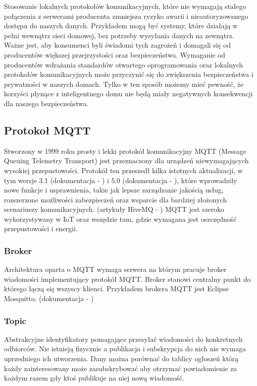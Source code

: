 Stosowanie lokalnych protokołów komunikacyjnych, które nie wymagają stałego połączenia z serwerami producenta zmniejsza ryzyko awarii i nieautoryzowanego dostępu do naszych danych. Przykładem mogą być systemy, które działają w pełni wewnątrz sieci domowej, bez potrzeby wysyłania danych na zewnątrz.\\

Ważne jest, aby konsumenci byli świadomi tych zagrożeń i domagali się od producentów większej przejrzystości oraz bezpieczeństwa. Wymaganie od producentów wdrażania standardów otwartego oprogramowania oraz lokalnych protokołów komunikacyjnych może przyczynić się do zwiększenia bezpieczeństwa i prywatności w naszych domach. Tylko w ten sposób możemy mieć pewność, że korzyści płynące z inteligentnego domu nie będą miały negatywnych konsekwencji dla naszego bezpieczeństwa.

\newpage

\subsection{Protokoł MQTT}
Stworzony w 1999 roku prosty i lekki protokół komunikacyjny MQTT (Message Queuing Telemetry Transport) jest przeznaczony dla urządzeń niewymagających wysokiej przepustowości. Protokół ten przeszedł kilka istotnych aktualizacji, w tym wersje 3.1 (dokumentacja - \cite{mqtt3spec}) i 5.0 (dokumentacja - \cite{mqtt5spec}), które wprowadziły nowe funkcje i usprawnienia, takie jak lepsze zarządzanie jakością usług, rozszerzone możliwości zabezpieczeń oraz wsparcie dla bardziej złożonych scenariuszy komunikacyjnych. (artykuły HiveMQ - \cite{mqtt5part1}\cite{mqtt5part2}) MQTT jest szeroko wykorzystywany w IoT oraz wszędzie tam, gdzie wymagana jest oszczędność przepustowości i energii.

\subsubsection{Broker}
Architektura oparta o MQTT wymaga serwera na którym pracuje broker wiadomości implementujący protokół MQTT. Broker stanowi centralny punkt do którego łączą się wszyscy klienci. Przykładem brokera MQTT jest Eclipse Mosquitto. (dokumentacja - \cite{mosquittodocs})

\subsubsection{Topic}
Abstrakcyjne identyfikatory pomagające przesyłać wiadomości do konkretnych odbiorców. Nie istnieją fizycznie a publikacja i subskrypcja do nich nie wymaga uprzedniego ich utworzenia. Dany  można porównać do tablicy ogłoszeń którą każdy zainteresowany może zasubskrybować aby otrzymać powiadomienie za każdym razem gdy ktoś publikuje na niej nową wiadomość.\\

